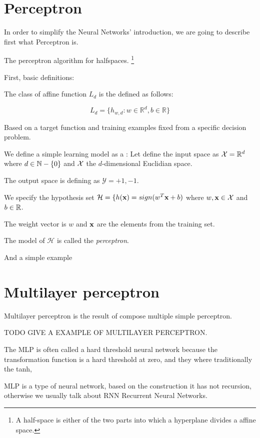 



\chapter{Perceptron}

In order to simplify the Neural Networks' introduction, we are going 
to describe first 
what Perceptron is. 

The perceptron algorithm for halfspaces.
 \footnote{A half-space is either of the two parts into which a hyperplane divides a affine space. } 


 First, basic definitions: 

 The class of affine function  $L_d$ is the defined as follows:

 $$L_d = \{ h_{w,d}: w \in \mathbb{R}^d, b \in \mathbb R\}$$

Based on a target function
and  training examples fixed from a specific decision problem.  

We define a simple learning model as a : 
Let define the input space as $\mathcal{X} = \mathbb{R}^d$ where $d \in \mathbb{N}-\{0\}$ and $\mathcal{X}$ 
the $d$-dimensional Euclidian space. 

The output space is defining as $\mathcal{Y}={+1, -1}$. 

We specify the hypothesis set $\mathcal{H} = \{ h(\textbf{x}) = sign(w^T \textbf{x} +b)$ where $w, \textbf{x} \in \mathcal{X}$
and $b \in \mathbb{R}$. 

The weight vector is $w$ and $\textbf{x}$ are the elements from the training set. 

The model of $\mathcal{H}$ is called the \textit{perceptron}.  

And a  simple example 


\chapter{Multilayer perceptron}  

Multilayer perceptron is the result of compose multiple simple perceptron. 

TODO GIVE A EXAMPLE OF MULTILAYER PERCEPTRON. 


The MLP is often called a hard threshold neural network because the transformation
function is a hard threshold at zero, and they where traditionally the tanh, 

MLP is a type of neural network, based on the construction it has not recursion, 
otherwise we usually talk about RNN Recurrent Neural Networks. 




